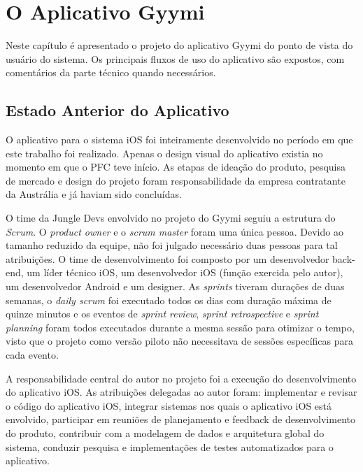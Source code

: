 \chapter{O Aplicativo Gyymi} \label{cap:gyymi}
Neste capítulo é apresentado o projeto do aplicativo Gyymi do ponto de vista do usuário do sistema. Os principais fluxos de uso do aplicativo são expostos, com comentários da parte técnico quando necessários.

\section{Estado Anterior do Aplicativo}
O aplicativo para o sistema iOS foi inteiramente desenvolvido no período em que este trabalho foi realizado. Apenas o design visual do aplicativo existia no momento em que o PFC teve início. As etapas de ideação do produto, pesquisa de mercado e design do projeto foram responsabilidade da empresa contratante da Austrália e já haviam sido concluídas.

O time da Jungle Devs envolvido no projeto do Gyymi seguiu a estrutura do \textit{Scrum}. O \textit{product owner} e o \textit{scrum master} foram uma única pessoa. Devido ao tamanho reduzido da equipe, não foi julgado necessário duas pessoas para tal atribuições. O time de desenvolvimento foi composto por um desenvolvedor back-end, um líder técnico iOS, um desenvolvedor iOS (função exercida pelo autor), um desenvolvedor Android e um designer. As \textit{sprints} tiveram durações de duas semanas, o \textit{daily scrum} foi executado todos os dias com duração máxima de quinze minutos e os eventos de \textit{sprint review}, \textit{sprint retrospective} e \textit{sprint planning} foram todos executados durante a mesma sessão para otimizar o tempo, visto que o projeto como versão piloto não necessitava de sessões específicas para cada evento.

A responsabilidade central do autor no projeto foi a execução do desenvolvimento do aplicativo iOS. As atribuições delegadas ao autor foram: implementar e revisar o código do aplicativo iOS, integrar sistemas nos quais o aplicativo iOS está envolvido, participar em reuniões de planejamento e feedback de desenvolvimento do produto, contribuir com a modelagem de dados e arquitetura global do sistema, conduzir pesquisa e implementações de testes automatizados para o aplicativo.


